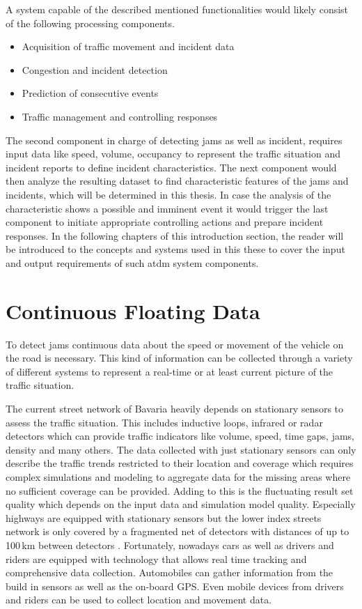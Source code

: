 A system capable of the described mentioned functionalities would likely consist of the following processing components.

\begin{itemize}
  \item Acquisition of traffic movement and incident data
  \item Congestion and incident detection
  \item Prediction of consecutive events
  \item Traffic management and controlling responses
\end{itemize}

The second component in charge of detecting jams as well as incident, requires input data like speed, volume, occupancy to represent the traffic situation and incident reports to define incident characteristics. The next component would then analyze the resulting dataset to find characteristic features of the jams and incidents, which will be determined in this thesis. In case the analysis of the characteristic shows a possible and imminent event it would trigger the last component to initiate appropriate controlling actions and prepare incident responses. In the following chapters of this introduction section, the reader will be introduced to the concepts and systems used in this these to cover the input and output requirements of such \acrshort{atdm} system components.

\section{Continuous Floating Data}
\label{introduction_continuous_floating_data}
To detect jams continuous data about the speed or movement of the vehicle on the road is necessary. This kind of information can be collected through a variety of different systems to represent a real-time or at least current picture of the traffic situation. 

The current street network of Bavaria heavily depends on stationary sensors to assess the traffic situation. This includes inductive loops, infrared or radar detectors which can provide traffic indicators like volume, speed, time gaps, jams, density and many others. The data collected with just stationary sensors can only describe the traffic trends restricted to their location and coverage which requires complex simulations and modeling to aggregate data for the missing areas where no sufficient coverage can be provided. Adding to this is the fluctuating result set quality which depends on the input data and simulation model quality. Especially highways are equipped with stationary sensors but the lower index streets network is only covered by a fragmented net of detectors with distances of up to 100\,km between detectors \parencite{INDRIX2015}. Fortunately, nowadays cars as well as drivers and riders are equipped with technology that allows real time tracking and comprehensive data collection. Automobiles can gather information from the build in sensors as well as the on-board GPS. Even mobile devices from drivers and riders can be used to collect location and movement data. \parencite{Randelhoff2016}

